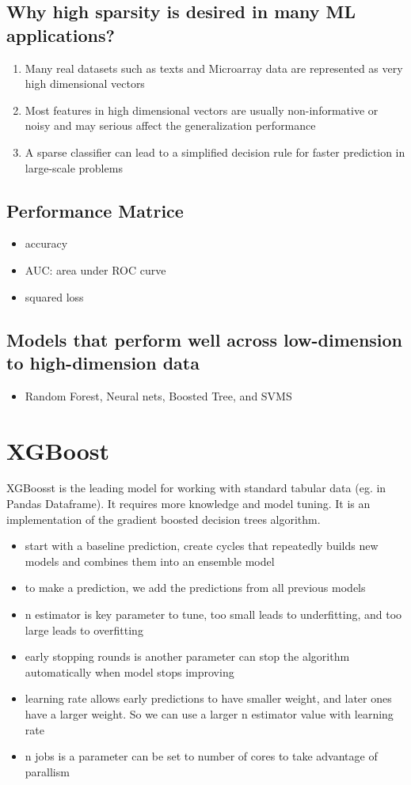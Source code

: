 \documentclass[11pt]{article}
\begin{document}
\subsection{Why high sparsity is desired in many ML applications?}
\label{sec:org3fd7b6e}
\begin{enumerate}
\item Many real datasets such as texts and Microarray data are represented as very high dimensional vectors
\item Most features in high dimensional vectors are usually non-informative or noisy and may serious affect the generalization performance
\item A sparse classifier can lead to a simplified decision rule for faster prediction in large-scale problems
\end{enumerate}
\subsection{Performance Matrice}
\label{sec:org6ac7670}
\begin{itemize}
\item accuracy
\item AUC: area under ROC curve
\item squared loss
\end{itemize}
\subsection{Models that perform well across low-dimension to high-dimension data}
\label{sec:org7c8a94d}
\begin{itemize}
\item Random Forest, Neural nets, Boosted Tree, and SVMS
\end{itemize}
\section{XGBoost}
\label{sec:orgc221df0}
XGBoosst is the leading model for working with standard tabular data (eg. in Pandas Dataframe). It requires more knowledge and model tuning. It is an implementation of the gradient boosted decision trees algorithm.
\begin{itemize}
\item start with a baseline prediction, create cycles that repeatedly builds new models and combines them into an ensemble model
\item to make a prediction, we add the predictions from all previous models
\item n estimator is key parameter to tune, too small leads to underfitting, and too large leads to overfitting
\item early stopping rounds is another parameter can stop the algorithm automatically when model stops improving
\item learning rate allows early predictions to have smaller weight, and later ones have a larger weight. So we can use a larger n estimator value with learning rate
\item n jobs is a parameter can be set to number of cores to take advantage of parallism
\end{itemize}
\end{document}
